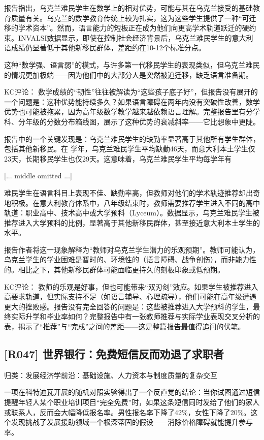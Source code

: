 \documentclass[11pt]{ctexart}
\begin{document}
报告指出，乌克兰难民学生在数学上的相对优势，可能与其在乌克兰接受的基础教育质量有关。乌克兰的数学教育传统上较为扎实，这为这些学生提供了一种“可迁移的学术资本”。然而，语言能力的短板正在成为他们向更高学术轨道跃迁的硬约束。INVALSI数据显示，即使在控制社会经济背景后，乌克兰难民学生的意大利语成绩仍显著低于其他新移民群体，差距约在10-12个标准分点。

这种“数学强、语言弱”的模式，与许多第一代移民学生的表现类似，但乌克兰难民的情况更加极端——因为他们中的大部分人是突然被迫迁移，缺乏语言准备期。

KC评论： 数学成绩的“韧性”往往被解读为“这些孩子底子好”，但报告没有展开的一个问题是：这种优势能持续多久？如果语言障碍在两年内没有突破性改善，数学优势也可能被拖累，因为高年级数学教学越来越依赖语言理解。完整报告里有分学科、分年级的分数分布箱线图，展示了这种优势的衰减斜率——它比想象中更陡。

报告中的一个关键发现是：乌克兰难民学生的缺勤率显著高于其他所有学生群体，包括其他新移民。在 学年，乌克兰难民学生平均缺勤46天，而意大利本土学生仅23天，长期移民学生也仅29天。这意味着，乌克兰难民学生平均每学年有

[... middle omitted ...]

难民学生在语言科目上表现不佳、缺勤率高，但教师对他们的学术轨迹推荐却出奇地积极。在意大利教育体系中，八年级结束时，教师需要推荐学生进入不同的高中轨道：职业高中、技术高中或大学预科（Lyceum）。数据显示，乌克兰难民学生被推荐进入大学预科的比例，显著高于其他新移民群体，甚至接近意大利本土学生的水平。

报告作者将这一现象解释为“教师对乌克兰学生潜力的乐观预期”。教师可能认为，乌克兰学生的学业困难是暂时的、环境性的（语言障碍、战争创伤），而非能力性的。相比之下，其他新移民群体可能面临更持久的刻板印象或低预期。

KC评论： 教师的乐观是好事，但也可能带来“双刃剑”效应。如果学生被推荐进入高要求轨道，但实际支持不足（如语言辅导、心理疏导），他们可能在高年级遭遇更大的挫败感。报告没有完全回答的问题是：这些被推荐进入大学预科的学生，最终实际升学和毕业率如何？完整报告中有一张教师推荐与实际学业表现交叉分析的表，揭示了“推荐”与“完成”之间的差距——这是整篇报告最值得追问的伏笔。

\subsection{[R047] 世界银行：免费短信反而劝退了求职者}
{\small\color{refgray}归类：发展经济学前沿：基础设施、人力资本与制度质量的复杂交互}

一项在科特迪瓦开展的随机对照实验得出了一个反直觉的结论：当你试图通过短信提醒年轻人某个职业培训项目“完全免费”时，如果这条短信同时发给了他们的家人或联系人，反而会大幅降低报名率。男性报名率下降了42\%，女性下降了20\%。这个发现挑战了发展援助领域一个根深蒂固的假设——消除价格障碍就能提升参与率。
\end{document}
